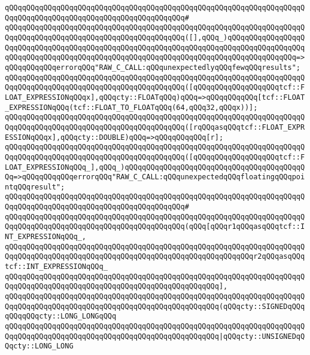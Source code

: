 \verb|qQQqqQQqqQQqqQQqqQQqqQQqqQQqqQQqqQQqqQQqqQQqqQQqqQQqqQQqqQQqqQQqqQQqqQQqqQQqqQQqqQQqqQQqqQQqqQQqqQQqqQQqqQQqqQQq#|\newline
\verb|qQQqqQQqqQQqqQQqqQQqqQQqqQQqqQQqqQQqqQQqqQQqqQQqqQQqqQQqqQQqqQQqqQQqqQQqqQQqqQQqqQQqqQQqqQQqqQQqqQQqqQQqqQQqqQQq([],qQQq_)qQQqqQQqqQQqqQQqqQQqqQQqqQQqqQQqqQQqqQQqqQQqqQQqqQQqqQQqqQQqqQQqqQQqqQQqqQQqqQQqqQQqqQQqqQQqqQQqqQQqqQQqqQQqqQQqqQQqqQQqqQQqqQQqqQQqqQQqqQQqqQQqqQQqqQQqqQQq=>qQQqqQQqqQQqerrorqQQq"RAW_C_CALL:qQQqunexpectedlyqQQqfewqQQqresults";|\newline
\verb|qQQqqQQqqQQqqQQqqQQqqQQqqQQqqQQqqQQqqQQqqQQqqQQqqQQqqQQqqQQqqQQqqQQqqQQqqQQqqQQqqQQqqQQqqQQqqQQqqQQqqQQqqQQqqQQq([qQQqqQQqqQQqqQQqqQQqtcf::FLOAT_EXPRESSIONqQQqx],qQQqcty::FLOATqQQq)qQQq=>qQQqqQQqqQQq[tcf::FLOAT_EXPRESSIONqQQq(tcf::FLOAT_TO_FLOATqQQq(64,qQQq32,qQQqx))];|\newline
\verb|qQQqqQQqqQQqqQQqqQQqqQQqqQQqqQQqqQQqqQQqqQQqqQQqqQQqqQQqqQQqqQQqqQQqqQQqqQQqqQQqqQQqqQQqqQQqqQQqqQQqqQQqqQQqqQQq([rqQQqasqQQqtcf::FLOAT_EXPRESSIONqQQqx],qQQqcty::DOUBLE)qQQq=>qQQqqQQqqQQq[r];|\newline
\verb|qQQqqQQqqQQqqQQqqQQqqQQqqQQqqQQqqQQqqQQqqQQqqQQqqQQqqQQqqQQqqQQqqQQqqQQqqQQqqQQqqQQqqQQqqQQqqQQqqQQqqQQqqQQqqQQq([qQQqqQQqqQQqqQQqqQQqtcf::FLOAT_EXPRESSIONqQQq_],qQQq_)qQQqqQQqqQQqqQQqqQQqqQQqqQQqqQQqqQQqqQQqqQQq=>qQQqqQQqqQQqerrorqQQq"RAW_C_CALL:qQQqunexpectedqQQqfloatingqQQqpointqQQqresult";|\newline
\newline
\verb|qQQqqQQqqQQqqQQqqQQqqQQqqQQqqQQqqQQqqQQqqQQqqQQqqQQqqQQqqQQqqQQqqQQqqQQqqQQqqQQqqQQqqQQqqQQqqQQqqQQqqQQqqQQqqQQq#|\newline
\verb|qQQqqQQqqQQqqQQqqQQqqQQqqQQqqQQqqQQqqQQqqQQqqQQqqQQqqQQqqQQqqQQqqQQqqQQqqQQqqQQqqQQqqQQqqQQqqQQqqQQqqQQqqQQqqQQq(qQQq[qQQqr1qQQqasqQQqtcf::INT_EXPRESSIONqQQq_,|\newline
\verb|qQQqqQQqqQQqqQQqqQQqqQQqqQQqqQQqqQQqqQQqqQQqqQQqqQQqqQQqqQQqqQQqqQQqqQQqqQQqqQQqqQQqqQQqqQQqqQQqqQQqqQQqqQQqqQQqqQQqqQQqqQQqqQQqr2qQQqasqQQqtcf::INT_EXPRESSIONqQQq_|\newline
\verb|qQQqqQQqqQQqqQQqqQQqqQQqqQQqqQQqqQQqqQQqqQQqqQQqqQQqqQQqqQQqqQQqqQQqqQQqqQQqqQQqqQQqqQQqqQQqqQQqqQQqqQQqqQQqqQQqqQQqqQQq],|\newline
\newline
\verb|qQQqqQQqqQQqqQQqqQQqqQQqqQQqqQQqqQQqqQQqqQQqqQQqqQQqqQQqqQQqqQQqqQQqqQQqqQQqqQQqqQQqqQQqqQQqqQQqqQQqqQQqqQQqqQQqqQQqqQQq(qQQqcty::SIGNEDqQQqqQQqqQQqcty::LONG_LONGqQQq|\newline
\verb|qQQqqQQqqQQqqQQqqQQqqQQqqQQqqQQqqQQqqQQqqQQqqQQqqQQqqQQqqQQqqQQqqQQqqQQqqQQqqQQqqQQqqQQqqQQqqQQqqQQqqQQqqQQqqQQqqQQqqQQq|\verb#|qQQqcty::UNSIGNEDqQQqcty::LONG_LONG#\newline
